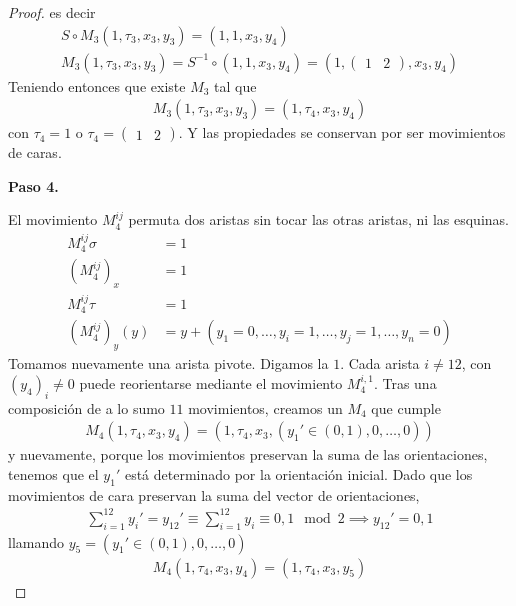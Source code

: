 \documentclass{article}
\theoremstyle{definition}
\begin{document}
\begin{proof}
    es decir
    \begin{align*}
        S\circ M_3(1,\tau_3,x_3,y_3)=(1,1,x_3,y_4)\\
        M_3(1,\tau_3,x_3,y_3)=S^{-1}\circ(1,1,x_3,y_4)=(1,\begin{pmatrix}
            1 & 2
        \end{pmatrix},x_3,y_4)
    \end{align*}
    Teniendo entonces que existe $M_3$ tal que
    \begin{align*}
        M_3(1,\tau_3,x_3,y_3)=(1,\tau_4,x_3,y_4)
    \end{align*}
    con $\tau_4=1$ o $\tau_4=\begin{pmatrix} 1 & 2\end{pmatrix}$. Y las propiedades se conservan por ser movimientos de caras.

    \noindent\textbf{Paso 4.}

    El movimiento $M_4^{ij}$ permuta dos aristas sin tocar las otras aristas, ni las esquinas.
    \begin{align*}
        M_4^{ij}\sigma  & =1                                             \\
        (M_4^{ij})_x    & =1                                             \\
        M_4^{ij}\tau    & =1                                             \\
        (M_4^{ij})_y(y) & =y+(y_1=0,\dots,y_i=1,\dots,y_j=1,\dots,y_n=0)
    \end{align*}
    Tomamos nuevamente una arista pivote. Digamos la $1$. Cada arista $i\neq 12$, con $(y_4)_i\neq 0$ puede reorientarse mediante el movimiento $M_4^{i,1}$. Tras una composición de a lo sumo $11$ movimientos, creamos un $M_4$ que cumple
    \begin{align*}
        M_4(1,\tau_4,x_3,y_4)=(1,\tau_4,x_3,(y_1'\in(0,1),0,\dots,0))
    \end{align*}
    y nuevamente, porque los movimientos preservan la suma de las orientaciones, tenemos que el $y_1'$ está determinado por la orientación inicial. Dado que los movimientos de cara preservan la suma del vector de orientaciones,
    \begin{align*}
        \sum_{i=1}^{12}y_i'=y_{12}'\equiv \sum_{i=1}^{12}y_i\equiv 0,1\mod 2\implies y_{12}'=0,1
    \end{align*}
    llamando $y_5=(y_1'\in(0,1),0,\dots,0)$
    \begin{align*}
        M_4(1,\tau_4,x_3,y_4)=(1,\tau_4,x_3,y_5)
    \end{align*}
    

\end{proof}
\end{document}
